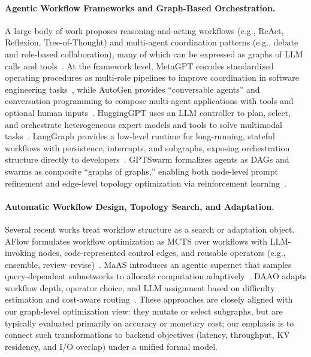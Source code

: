 \paragraph{Agentic Workflow Frameworks and Graph-Based Orchestration.}
A large body of work proposes reasoning-and-acting workflows (e.g., ReAct, Reflexion, Tree-of-Thought) and multi-agent coordination patterns (e.g., debate and role-based collaboration), many of which can be expressed as graphs of LLM calls and tools~\citep{zhuge2024gptswarm}. At the framework level, MetaGPT encodes standardized operating procedures as multi-role pipelines to improve coordination in software engineering tasks~\citep{hong2023metagpt}, while AutoGen provides ``conversable agents'' and conversation programming to compose multi-agent applications with tools and optional human inputs~\citep{wu2023autogen}. HuggingGPT uses an LLM controller to plan, select, and orchestrate heterogeneous expert models and tools to solve multimodal tasks~\citep{shen2023hugginggpt}. LangGraph provides a low-level runtime for long-running, stateful workflows with persistence, interrupts, and subgraphs, exposing orchestration structure directly to developers~\citep{langgraph2024docs}. GPTSwarm formalizes agents as DAGs and swarms as composite ``graphs of graphs,'' enabling both node-level prompt refinement and edge-level topology optimization via reinforcement learning~\citep{zhuge2024gptswarm}.

\paragraph{Automatic Workflow Design, Topology Search, and Adaptation.}
Several recent works treat workflow structure as a search or adaptation object. AFlow formulates workflow optimization as MCTS over workflows with LLM-invoking nodes, code-represented control edges, and reusable operators (e.g., ensemble, review--revise)~\citep{zhang2024aflow}. MaAS introduces an agentic supernet that samples query-dependent subnetworks to allocate computation adaptively~\citep{zhang2025maas}. DAAO adapts workflow depth, operator choice, and LLM assignment based on difficulty estimation and cost-aware routing~\citep{su2025daao}. These approaches are closely aligned with our graph-level optimization view: they mutate or select subgraphs, but are typically evaluated primarily on accuracy or monetary cost; our emphasis is to connect such transformations to backend objectives (latency, throughput, KV residency, and I/O overlap) under a unified formal model.


